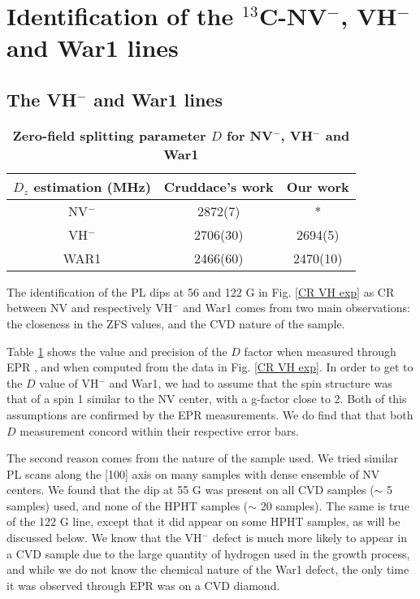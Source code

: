 \documentclass[a4paper, 11pt]{report}
\begin{document}
\section{Identification of the $^{13}$C-NV$^-$, VH$^-$ and War1 lines}

\subsection{The VH$^-$ and War1 lines}
\begin{table}[htbp]
\centering
\caption{\bf Zero-field splitting parameter $D$ for NV$^-$, VH$^-$ and War1}
\begin{tabular}{ccc}
\hline
$D_z$ estimation (MHz) & Cruddace's work\citep{cruddace2007magnetic} & Our work \\
\hline
NV$^-$ & 2872(7) & * \\
VH$^-$ & 2706(30) & 2694(5)  \\
WAR1 & 2466(60) & 2470(10) \\
\hline
\end{tabular}
  \label{table VH et War1}
\end{table}

The identification of the PL dips at 56 and 122 G in Fig. \ref{CR VH exp} as CR between NV and respectively VH$^-$ and War1 comes from two main observations: the closeness in the ZFS values, and the CVD nature of the sample.

Table \ref{table VH et War1} shows the value and precision of the $D$ factor when measured through EPR \citep{cruddace2007magnetic}, and when computed from the data in Fig. \ref{CR VH exp}. In order to get to the $D$ value of VH$^-$ and War1, we had to assume that the spin structure was that of a spin 1 similar to the NV center, with a g-factor close to 2. Both of this assumptions are confirmed by the EPR measurements. We do find that that both $D$ measurement concord within their respective error bars.

The second reason comes from the nature of the sample used. We tried similar PL scans along the [100] axis on many samples with dense ensemble of NV centers. We found that the dip at 55 G was present on all CVD samples ($\sim$ 5 samples) used, and none of the HPHT samples ($\sim$ 20 samples). The same is true of the 122 G line, except that it did appear on some HPHT samples, as will be discussed below. We know that the VH$^-$ defect is much more likely to appear in a CVD sample due to the large quantity of hydrogen used in the growth process, and while we do not know the chemical nature of the War1 defect, the only time it was observed through EPR was on a CVD diamond.
\end{document}
